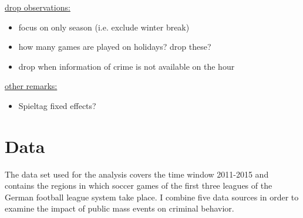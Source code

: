 \documentclass[11pt, a4paper]{article} %
\begin{document}
\underline{drop observations:}
\begin{itemize}
	\item focus on only season (i.e. exclude winter break)
	\item how many games are played on holidays? drop these? 
	\item drop when information of crime is not available on the hour
\end{itemize}



\underline{other remarks:}
\begin{itemize}
	\item Spieltag fixed effects?
\end{itemize}



\newpage
\section{Data}\label{sec_soc_ext:data} 
The data set used for the analysis covers the time window 2011-2015 and contains the regions in which soccer games of the first three leagues of the German football league system take place. I combine five data sources in order to examine the impact of public mass events on criminal behavior.
\end{document}
